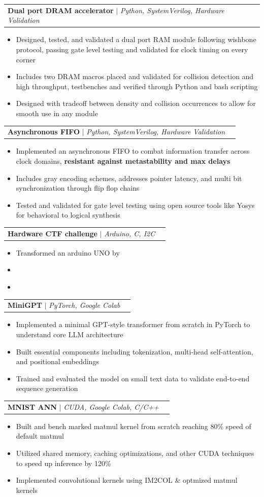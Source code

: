 \documentclass[letterpaper,11pt]{article}
\makeatletter
\newcommand{\resumeItem}[1]{
  \item\small{
    {#1 \vspace{-2pt}}
  }
}
\newcommand{\resumeProjectHeading}[2]{
    \item
    \begin{tabular*}{0.97\textwidth}{l@{\extracolsep{\fill}}r}
      \small#1 & #2 \\
    \end{tabular*}\vspace{-7pt}
}
\newcommand{\resumeItemListStart}{\begin{itemize}}
\newcommand{\resumeItemListEnd}{\end{itemize}\vspace{-5pt}}
\makeatother
\begin{document}
          \resumeProjectHeading
          {\textbf{Dual port DRAM accelerator} $|$ \emph{Python, SystemVerilog, Hardware Validation}}{}
          \resumeItemListStart
            \resumeItem{Designed, tested, and validated a dual port RAM module following wishbone protocol, passing gate level testing and validated for clock timing on every corner}
            \resumeItem{Includes two DRAM macros placed and validated for collision detection and high throughput, testbenches and verified through Python and bash scripting}
            \resumeItem{Designed with tradeoff between density and collision occurrences to allow for smooth use in any module}
          \resumeItemListEnd

        \resumeProjectHeading
          {\textbf{Asynchronous FIFO} $|$ \emph{Python, SystemVerilog, Hardware Validation}}{}
          \resumeItemListStart
            \resumeItem{Implemented an asynchronous FIFO to combat information transfer across clock domains, \textbf{resistant against metastability and max delays} }
            \resumeItem{Includes gray encoding schemes, addresses pointer latency, and multi bit synchronization through flip flop chains}
            \resumeItem{Tested and validated for gate level testing using open source tools like Yosys for behavioral to logical synthesis}
          \resumeItemListEnd

        \resumeProjectHeading
          {\textbf{Hardware CTF challenge} $|$ \emph{Arduino, C, I2C}}{}
          \resumeItemListStart
            \resumeItem{Transformed an arduino UNO by }
            \resumeItem{}
            \resumeItem{}
          \resumeItemListEnd

        \resumeProjectHeading
          {\textbf{MiniGPT} $|$ \emph{PyTorch, Google Colab}}{}
          \resumeItemListStart
            \resumeItem{Implemented a minimal GPT-style transformer from scratch in PyTorch to understand core LLM architecture}
            \resumeItem{Built essential components including tokenization, multi-head self-attention, and positional embeddings}
            \resumeItem{Trained and evaluated the model on small text data to validate end-to-end sequence generation}
          \resumeItemListEnd
        
        \resumeProjectHeading
          {\textbf{MNIST ANN} $|$ \emph{CUDA, Google Colab, C/C++}}{}
          \resumeItemListStart
            \resumeItem{Built and bench marked matmul kernel from scratch reaching 80\% speed of default matmul}
            \resumeItem{Utilized shared memory, caching optimizations, and other CUDA techniques to speed up inference by 120\%}
            \resumeItem{Implemented convolutional kernels using IM2COL \& optmized matmul kernels}
          \resumeItemListEnd
\end{document}
